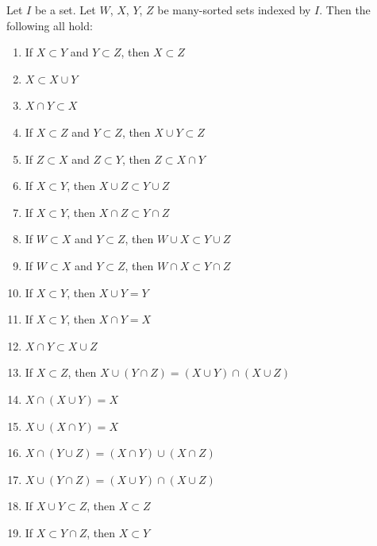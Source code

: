 \begin{theorem}
Let $I$ be a set. Let $W$, $X$, $Y$, $Z$ be many-sorted sets indexed by $I$.
Then the following all hold:
\begin{enumerate}
\item{} If $X\subset Y$ and $Y\subset Z$, then $X\subset Z$
\item{} $X\subset X\cup Y$
\item{} $X\cap Y\subset X$
\item{} If $X\subset Z$ and $Y\subset Z$, then $X\cup Y\subset Z$
\item{} If $Z\subset X$ and $Z\subset Y$, then $Z\subset X\cap Y$
\item{} If $X\subset Y$, then $X\cup Z\subset Y\cup Z$
\item{} If $X\subset Y$, then $X\cap Z\subset Y\cap Z$
\item{} If $W\subset X$ and $Y\subset Z$, then $W\cup X\subset Y\cup Z$
\item{} If $W\subset X$ and $Y\subset Z$,
  then $W\cap X\subset Y\cap Z$
\item{} If $X\subset Y$, then $X\cup Y=Y$
\item{} If $X\subset Y$, then $X\cap Y=X$
\item{} $X\cap Y\subset X\cup Z$
\item{} If $X\subset Z$, then $X\cup(Y\cap Z)=(X\cup Y)\cap(X\cup Z)$
\item{} $X\cap(X\cup Y)=X$
\item{} $X\cup(X\cap Y)=X$
\item{} $X\cap (Y\cup Z)=(X\cap Y)\cup(X\cap Z)$
\item{} $X\cup(Y\cap Z)=(X\cup Y)\cap(X\cup Z)$
\item{} If $X\cup Y\subset Z$, then $X\subset Z$
\item{} If $X\subset Y\cap Z$, then $X\subset Y$
\end{enumerate}
\end{theorem}

